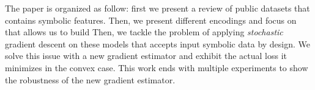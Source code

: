 The paper is organized as follow: first we present a review of public datasets that contains symbolic features. Then, we present different encodings and focus on \ohe that allows us to build \catmod %
Then, we tackle the problem of applying \textit{stochastic} gradient descent on these models that accepts input symbolic data by design. We solve this issue with a new gradient estimator and exhibit the actual loss it minimizes in the convex case. This work ends with multiple experiments to show the robustness of the new gradient estimator. 




